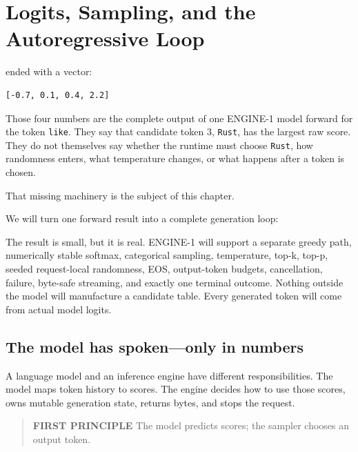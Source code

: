 \chapter{Logits, Sampling, and the Autoregressive Loop}\label{chapter-4-logits-sampling-and-the-autoregressive-loop}\label{app:sampling}
 ended with a vector:

\begin{verbatim}
[-0.7, 0.1, 0.4, 2.2]
\end{verbatim}

Those four numbers are the complete output of one ENGINE-1 model forward
for the token \texttt{like}. They say that candidate token 3,
\texttt{Rust}, has the largest raw score. They do not themselves say
whether the runtime must choose \texttt{Rust}, how randomness enters,
what temperature changes, or what happens after a token is chosen.

That missing machinery is the subject of this chapter.

We will turn one forward result into a complete generation loop:


The result is small, but it is real. ENGINE-1 will support a separate
greedy path, numerically stable softmax, categorical sampling,
temperature, top-k, top-p, seeded request-local randomness, EOS,
output-token budgets, cancellation, failure, byte-safe streaming, and
exactly one terminal outcome. Nothing outside the model will manufacture
a candidate table. Every generated token will come from actual model
logits.

\section{The model has spoken---only in
numbers}\label{the-model-has-spokenonly-in-numbers}

A language model and an inference engine have different
responsibilities. The model maps token history to scores. The engine
decides how to use those scores, owns mutable generation state, returns
bytes, and stops the request.

\begin{quote}
\textbf{FIRST PRINCIPLE} The model predicts scores; the sampler chooses
an output token.
\end{quote}

